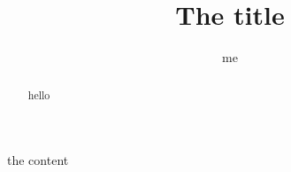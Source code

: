 \documentclass{ximera}
\title{The title}
\author{me}
\begin{document}
\begin{abstract}
hello
\end{abstract}
\maketitle

the content
\end{document}
